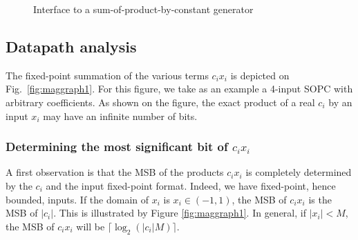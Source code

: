 \documentclass[twocolumn]{IEEEtran}
\begin{document}
\begin{figure}[h]
  \centering
  \caption{Interface to a sum-of-product-by-constant generator}
  \label{fig:interfaceSOPC}
\end{figure}

\subsection{Datapath analysis}


The fixed-point summation of the various terms $c_ix_i$ is depicted on Fig.~\ref{fig:maggraph1}.
For this figure, we take as an example a 4-input SOPC with arbitrary coefficients.
As shown on the figure, the exact  product of a real $c_i$ by an input $x_i$ may have an infinite number of bits. 

\subsubsection{Determining the most significant bit of $c_ix_i$ \label{sec:determ-most-sign}}
A first observation is that the MSB of the products $c_ix_i$ is completely determined by the $c_i$ and the input fixed-point format.
Indeed, we have fixed-point, hence bounded, inputs. 
If the domain of $x_i$ is $x_i\in (-1,1)$, the  MSB of $c_ix_i$ is the MSB of $|c_i|$.
This is illustrated by Figure \ref{fig:maggraph1}.
In general, if $|x_i|<M$, the MSB of $c_ix_i$ will be $\lceil \log_2(|c_i|M)\rceil$.
\end{document}
